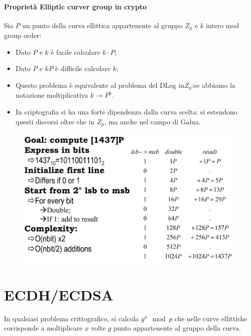 \documentclass{book}
\begin{document}
\subsubsection{Proprietà Elliptic curver group in crypto}
Sia \(P\) un punto della curva ellittica appartenente al gruppo \(Z_{p}\) e \(k\) intero mod group order:
\begin{itemize}
	\item Dato \(P\) e \(k\) è facile calcolare \(k\cdot P\);
	\item Dato \(P\) e \(kP\) è difficile calcolare \(k\);
	\item Questo problema è equivalente al problema del DLog in\(Z_{p}\):se abbiamo la notazione moltiplicativa \(k\rightarrow P^{k}\).
	\item In criptografia si ha una forte dipendenza dalla curva scelta: si estendono questi discorsi oltre che in \(Z_{p}\), ma anche nel campo di Galua.
\end{itemize}
\begin{figure}[h]
	\centering
	\includegraphics[scale=1]{2022-01-12-11-39-51.png}%
\end{figure}
\chapter{ECDH/ECDSA}
In qualsiasi problema crittografico, si calcola \(g^{x}\mod{p}\) che nelle curve ellittiche corrisponde a moltiplicare \(x\) volte \(g\) punto appartenente al gruppo della curva.
\end{document}
